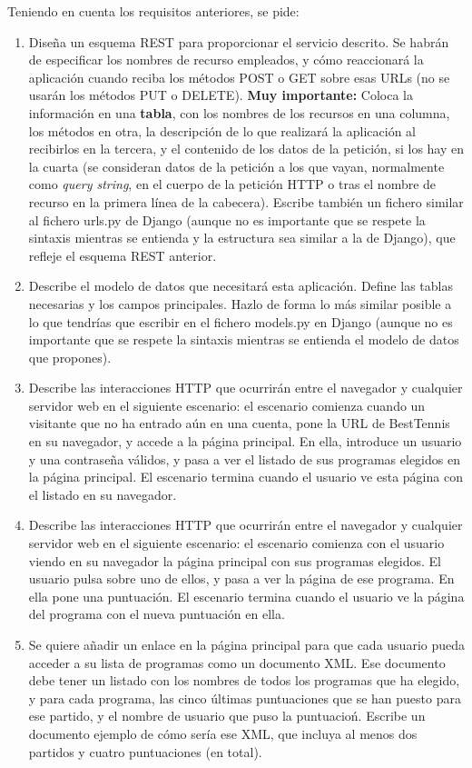 Teniendo en cuenta los requisitos anteriores, se pide:

\begin{enumerate}
\item Diseña un esquema REST para proporcionar el servicio descrito. Se habrán de especificar los nombres de recurso empleados, y cómo reaccionará la aplicación cuando reciba los métodos POST o GET sobre esas URLs (no se usarán los métodos PUT o DELETE). \textbf{Muy importante:} Coloca la información en una \textbf{tabla}, con los nombres de los recursos en una columna, los métodos en otra, la descripción de lo que realizará la aplicación al recibirlos en la tercera, y el contenido de los datos de la petición, si los hay en la cuarta (se consideran datos de la petición a los que vayan, normalmente como \emph{query string}, en el cuerpo de la petición HTTP o tras el nombre de recurso en la primera línea de la cabecera). Escribe también un fichero similar al fichero urls.py de Django (aunque no es importante que se respete la sintaxis mientras se entienda y la estructura sea similar a la de Django), que refleje el esquema REST anterior. 
\item Describe el modelo de datos que necesitará esta aplicación. Define las tablas necesarias y los campos principales. Hazlo de forma lo más similar posible a lo que tendrías que escribir en el fichero models.py en Django (aunque no es importante que se respete la sintaxis mientras se entienda el modelo de datos que propones).
\item Describe las interacciones HTTP que ocurrirán entre el navegador y cualquier servidor web en el siguiente escenario: el escenario comienza cuando un visitante que no ha entrado aún en una cuenta, pone la URL de BestTennis en su navegador, y accede a la página principal. En ella, introduce un usuario y una contraseña válidos, y pasa a ver el listado de sus programas elegidos en la página principal. El escenario termina cuando el usuario ve esta página con el listado en su navegador.
\item Describe las interacciones HTTP que ocurrirán entre el navegador y cualquier servidor web en el siguiente escenario: el escenario comienza con el usuario viendo en su navegador la página principal con sus programas elegidos. El usuario pulsa sobre uno de ellos, y pasa a ver la página de ese programa. En ella pone una puntuación. El escenario termina cuando el usuario ve la página del programa con el nueva puntuación en ella.
\item Se quiere añadir un enlace en la página principal para que cada usuario pueda acceder a su lista de programas como un documento XML. Ese documento debe tener un listado con los nombres de todos los programas que ha elegido, y para cada programa, las cinco últimas puntuaciones que se han puesto para ese partido, y el nombre de usuario que puso la puntuacioń. Escribe un documento ejemplo de cómo sería ese XML, que incluya al menos dos partidos y cuatro puntuaciones (en total).

\end{enumerate}

